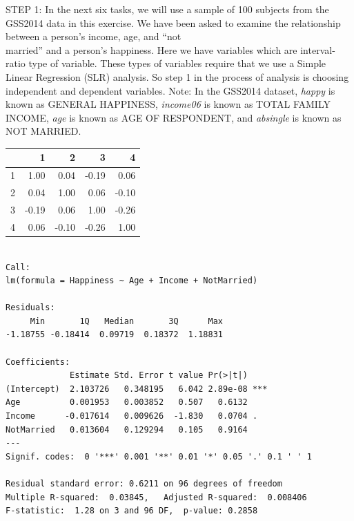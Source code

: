 \documentclass[11pt, chapterprefix=true]{scrbook}\usepackage[]{graphicx}\usepackage[]{color}
\begin{document}
\begin{exercises}
\begin{exercise}
    STEP 1:  In the next six tasks, we will use a sample of 100 subjects from the GSS2014 data in this exercise.  We have been asked to examine the relationship between a person's income, age, and ``not \\ married'' and a person's happiness.  Here we have variables which are  interval-ratio type of variable.  These types of variables require that we use a Simple Linear Regression (SLR) analysis.  So step 1 in the process of analysis is choosing independent and dependent variables.  Note: In the GSS2014 dataset, {\textit{happy}} is known as GENERAL HAPPINESS, {\textit{income06}} is known as TOTAL FAMILY INCOME, {\textit{age}} is known as AGE OF RESPONDENT, and {\textit{absingle}} is known as NOT MARRIED.

{\small{
\begin{table}[ht]
\centering
\begin{tabular}{rrrrr}
  \hline
 & 1 & 2 & 3 & 4 \\ 
  \hline
1 & 1.00 & 0.04 & -0.19 & 0.06 \\ 
  2 & 0.04 & 1.00 & 0.06 & -0.10 \\ 
  3 & -0.19 & 0.06 & 1.00 & -0.26 \\ 
  4 & 0.06 & -0.10 & -0.26 & 1.00 \\ 
   \hline
\end{tabular}
\end{table}

}}

{\tiny{
  \begin{verbatim}

Call:
lm(formula = Happiness ~ Age + Income + NotMarried)

Residuals:
     Min       1Q   Median       3Q      Max 
-1.18755 -0.18414  0.09719  0.18372  1.18831 

Coefficients:
             Estimate Std. Error t value Pr(>|t|)    
(Intercept)  2.103726   0.348195   6.042 2.89e-08 ***
Age          0.001953   0.003852   0.507   0.6132    
Income      -0.017614   0.009626  -1.830   0.0704 .  
NotMarried   0.013604   0.129294   0.105   0.9164    
---
Signif. codes:  0 '***' 0.001 '**' 0.01 '*' 0.05 '.' 0.1 ' ' 1

Residual standard error: 0.6211 on 96 degrees of freedom
Multiple R-squared:  0.03845,	Adjusted R-squared:  0.008406 
F-statistic:  1.28 on 3 and 96 DF,  p-value: 0.2858


  \end{verbatim}
}}


\end{exercise}
\end{exercises}
\end{document}
